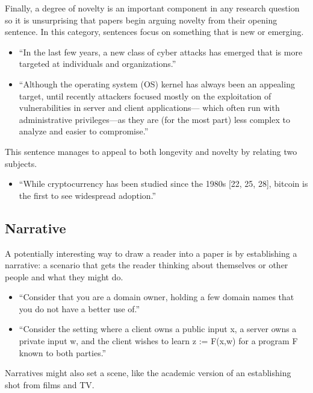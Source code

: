 \documentclass[sigconf,anonymous]{acmart}
\begin{document}
	Finally, a degree of novelty is an important component in any research question so it is unsurprising that papers begin arguing novelty from their opening sentence. In this category, sentences focus on something that is new or emerging.
	\begin{itemize}
		\item 	``In the last few years, a new class of cyber attacks has emerged that is more targeted at individuals and organizations.''~\cite{le2014look}

		\item  ``Although the operating system (OS) kernel has always been an appealing target, until recently attackers focused mostly on the exploitation of vulnerabilities in server and client applications— which often run with administrative privileges—as they are (for the most part) less complex to analyze and easier to compromise.''~\cite{kemerlis2014ret2dir}
	\end{itemize}

	This sentence manages to appeal to both longevity and novelty by relating two subjects.
	\begin{itemize}

		\item  ``While cryptocurrency has been studied since the 1980s [22, 25, 28], bitcoin is the first to see widespread adoption.''~\cite{heilman2015eclipse}

	\end{itemize}

	\subsection{Narrative}

	A potentially interesting way to draw a reader into a paper is by establishing a narrative: a scenario that gets the reader thinking about themselves or other people and what they might do.
	\begin{itemize}
		\item 	``Consider that you are a domain owner, holding a few domain names that you do not have a better use of.''~\cite{alrwais2014understanding}

		\item 	``Consider the setting where a client owns a public input x, a server owns a private input w, and the client wishes to learn z := F(x,w) for a program F known to both parties.''~\cite{ben2014succinct}
	\end{itemize}

	Narratives might also set a scene, like the academic version of an establishing shot from films and TV.
\end{document}
